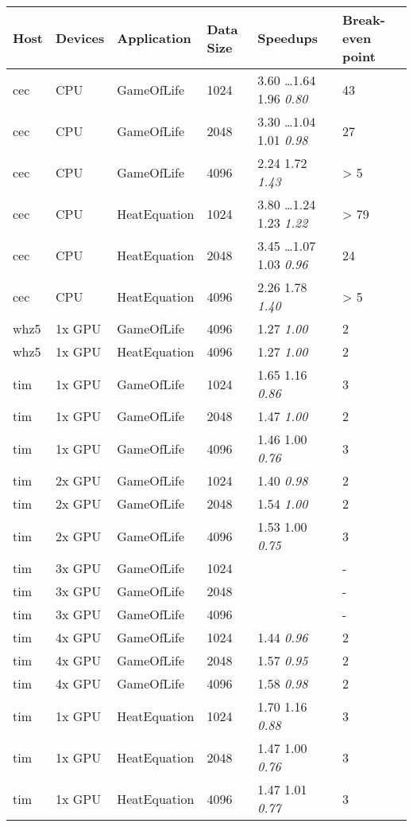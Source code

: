 \begin{tabular}{| l | l | l | l | l | l |}
\hline
\textbf{Host} & \textbf{Devices} & \textbf{Application} & \textbf{Data Size} & \textbf{Speedups} & \textbf{Break-even point}\\
\hline
cec & CPU & GameOfLife & 1024 & 3.60 \ldots 1.64 1.96 \textit{0.80} & 43 \\
cec & CPU & GameOfLife & 2048 & 3.30 \ldots 1.04 1.01 \textit{0.98} & 27 \\
cec & CPU & GameOfLife & 4096 & 2.24 1.72 \textit{1.43} & > 5 \\
cec & CPU & HeatEquation & 1024 & 3.80 \ldots 1.24 1.23 \textit{1.22} & > 79 \\
cec & CPU & HeatEquation & 2048 & 3.45 \ldots 1.07 1.03 \textit{0.96} & 24 \\
cec & CPU & HeatEquation & 4096 & 2.26 1.78 \textit{1.40} & > 5 \\
whz5 & 1x GPU & GameOfLife & 4096 & 1.27 \textit{1.00} & 2 \\
whz5 & 1x GPU & HeatEquation & 4096 & 1.27 \textit{1.00} & 2 \\
tim & 1x GPU & GameOfLife & 1024 & 1.65 1.16 \textit{0.86} & 3 \\
tim & 1x GPU & GameOfLife & 2048 & 1.47 \textit{1.00} & 2 \\
tim & 1x GPU & GameOfLife & 4096 & 1.46 1.00 \textit{0.76} & 3 \\
tim & 2x GPU & GameOfLife & 1024 & 1.40 \textit{0.98} & 2 \\
tim & 2x GPU & GameOfLife & 2048 & 1.54 \textit{1.00} & 2 \\
tim & 2x GPU & GameOfLife & 4096 & 1.53 1.00 \textit{0.75} & 3 \\
tim & 3x GPU & GameOfLife & 1024 &  & - \\
tim & 3x GPU & GameOfLife & 2048 &  & - \\
tim & 3x GPU & GameOfLife & 4096 &  & - \\
tim & 4x GPU & GameOfLife & 1024 & 1.44 \textit{0.96} & 2 \\
tim & 4x GPU & GameOfLife & 2048 & 1.57 \textit{0.95} & 2 \\
tim & 4x GPU & GameOfLife & 4096 & 1.58 \textit{0.98} & 2 \\
tim & 1x GPU & HeatEquation & 1024 & 1.70 1.16 \textit{0.88} & 3 \\
tim & 1x GPU & HeatEquation & 2048 & 1.47 1.00 \textit{0.76} & 3 \\
tim & 1x GPU & HeatEquation & 4096 & 1.47 1.01 \textit{0.77} & 3 \\

\end{tabular}
